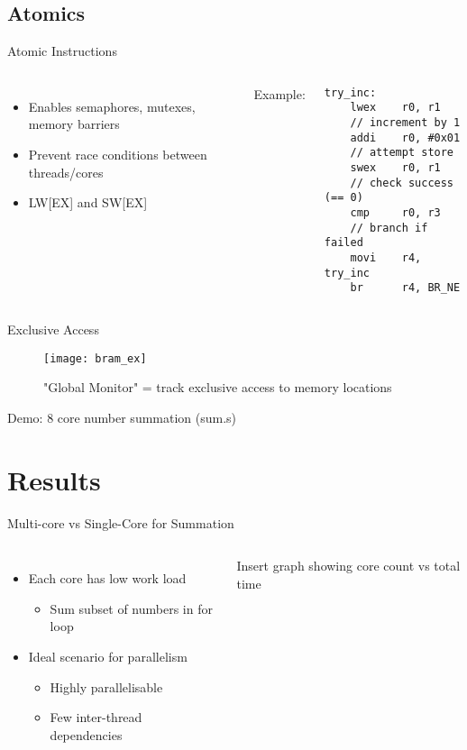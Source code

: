 \documentclass[aspectratio=169]{beamer}
\begin{document}
\subsection{Atomics}
\begin{frame}[fragile]{Atomic Instructions}
\begin{columns}[t]
\begin{itemize}\setlength{\itemsep 1em}
    \item Enables semaphores, mutexes, memory barriers
    \item Prevent race conditions between threads/cores
    \item LW[EX] and SW[EX]
\end{itemize}
Example:
\begin{lstlisting}[basicstyle=\scriptsize]
try_inc:
    lwex    r0, r1
    // increment by 1
    addi    r0, #0x01
    // attempt store
    swex    r0, r1
    // check success (== 0)
    cmp     r0, r3
    // branch if failed
    movi    r4, try_inc
    br      r4, BR_NE
\end{lstlisting}
\end{columns}
\end{frame}

\begin{frame}[fragile]{Exclusive Access}
\begin{figure}
    \centering
    \texttt{[image: bram\_ex]}
    \caption{"Global Monitor" = track exclusive access to memory locations}
    \label{}
\end{figure}
Demo: 8 core number summation (sum.s)
\end{frame}

\section{Results}
\frame{\tableofcontents[currentsection, subsectionstyle=show/show/hide]}

\begin{frame}{Multi-core vs Single-Core for Summation}
\begin{columns}[t]
\begin{itemize}\setlength{\itemsep 2em}
    \item Each core has low work load
        \begin{itemize}
            \item Sum subset of numbers in for loop
        \end{itemize}
    \item Ideal scenario for parallelism
    \begin{itemize}
        \item Highly parallelisable
        \item Few inter-thread dependencies
    \end{itemize}
\end{itemize}
Insert graph showing core count vs total time
\end{columns}
\end{frame}
\end{document}
